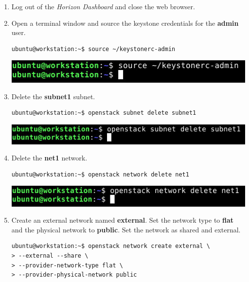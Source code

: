 \documentclass[letterpaper, 12pt]{article}
\begin{document}
\begin{enumerate}
    \item Log out of the \textit{Horizon Dashboard} and close the web browser.
    
    \item Open a terminal window and source the keystone credentials for the \textbf{admin} user.
\begin{lstlisting}
ubuntu@workstation:~$ source ~/keystonerc-admin
\end{lstlisting}

    \begin{center}
        \includegraphics[width=\linewidth]{images/part1/step9.png}
    \end{center}

    \item Delete the \textbf{subnet1} subnet.
\begin{lstlisting}
ubuntu@workstation:~$ openstack subnet delete subnet1
\end{lstlisting}

    \begin{center}
        \includegraphics[width=\linewidth]{images/part1/step10.png}
    \end{center}

    \item Delete the \textbf{net1} network.
\begin{lstlisting}
ubuntu@workstation:~$ openstack network delete net1
\end{lstlisting}

    \begin{center}
        \includegraphics[width=\linewidth]{images/part1/step11.png}
    \end{center}

    \item Create an external network named \textbf{external}. Set the network type to \textbf{flat} and the physical
    network to \textbf{public}. Set the network as shared and external.
\begin{lstlisting}
ubuntu@workstation:~$ openstack network create external \
> --external --share \
> --provider-network-type flat \
> --provider-physical-network public
\end{lstlisting}


\end{enumerate}
\end{document}

